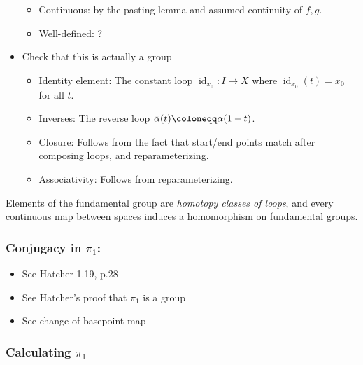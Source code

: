 \begin{definition}
\begin{itemize}
  \begin{itemize}
  \item
    Continuous: by the pasting lemma and assumed continuity of \(f, g\).
  \item
    Well-defined: ?
  \end{itemize}
\item
  Check that this is actually a group

  \begin{itemize}
  \item
    Identity element: The constant loop
    \(\operatorname{id}_{x_0}: I\to X\) where
    \(\operatorname{id}_{x_0}(t) = x_0\) for all \(t\).
  \item
    Inverses: The reverse loop
    \(\mkern 1.5mu\overline{\mkern-1.5mu\alpha\mkern-1.5mu}\mkern 1.5mu(t) \coloneqq\alpha(1-t)\).
  \item
    Closure: Follows from the fact that start/end points match after
    composing loops, and reparameterizing.
  \item
    Associativity: Follows from reparameterizing.
  \end{itemize}
\end{itemize}

\end{definition}

\begin{remark}[a summary]

Elements of the fundamental group are \emph{homotopy classes of loops},
and every continuous map between spaces induces a homomorphism on
fundamental groups.

\end{remark}

\hypertarget{conjugacy-in-pi_1}{%
\subsubsection{\texorpdfstring{Conjugacy in
\(\pi_{1}\):}{Conjugacy in \textbackslash pi\_\{1\}:}}\label{conjugacy-in-pi_1}}

\begin{itemize}
\tightlist
\item
  See Hatcher 1.19, p.28
\item
  See Hatcher's proof that \(\pi_{1}\) is a group
\item
  See change of basepoint map
\end{itemize}

\hypertarget{calculating-pi_1}{%
\subsubsection{\texorpdfstring{Calculating
\(\pi_1\)}{Calculating \textbackslash pi\_1}}\label{calculating-pi_1}}

